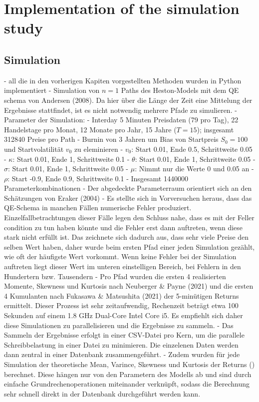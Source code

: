 \chapter{Implementation of the simulation study}
\label{sec:methodical_approach}

\section{Simulation}
- all die in den vorherigen Kapiten vorgestellten Methoden wurden in Python implementiert
- Simulation von $n=1$ Paths des Heston-Models mit dem QE schema von Andersen (2008). Da hier über die Länge der Zeit eine Mittelung der Ergebnisse stattfindet, ist es nicht notwendig mehrere Pfade zu simulieren.
- Parameter der Simulation:
    - Interday 5 Minuten Preisdaten (79 pro Tag), 22 Handelstage pro Monat, 12 Monate pro Jahr, 15 Jahre ($T = 15$); insgesamt 312840 Preise pro Path
    - Burnin von 3 Jahren um Bias von Startpreis $S_0 = 100$ und Startvolatilität $v_0$ zu eleminieren
    - $v_0$: Start 0.01, Ende 0.5, Schrittweite 0.05
    - $\kappa$: Start 0.01, Ende 1, Schrittweite 0.1
    - $\theta$: Start 0.01, Ende 1, Schrittweite 0.05
    - $\sigma$: Start 0.01, Ende 1, Schrittweite 0.05
    - $\mu$: Nimmt nur die Werte 0 und 0.05 an
    - $\rho$: Start -0.9, Ende 0.9, Schrittweite 0.1
    - Insgesamt 1440000 Parameterkombinationen
    - Der abgedeckte Parameterraum orientiert sich an den Schätzungen von Eraker (2004)
- Es stellte sich in Vorversuchen heraus, dass das QE-Schema in manchen Fällen numerische Fehler produziert. Einzelfallbetrachtungen dieser Fälle legen den Schluss nahe, dass es mit der Feller condition zu tun haben könnte und die Fehler erst dann auftreten, wenn diese stark nicht erfüllt ist. Das zeichnete sich dadurch aus, dass sehr viele Preise den selben Wert haben, daher wurde beim ersten Pfad einer jeden Simulation gezählt, wie oft der häufigste Wert vorkommt. Wenn keine Fehler bei der Simulation auftreten liegt dieser Wert im unteren einstelligen Bereich, bei Fehlern in den Hundertern bzw. Tausendern
- Pro Pfad wurden die ersten 4 realisierten Momente, Skewness und Kurtosis nach Neuberger & Payne (2021) und die ersten 4 Kumulanten nach Fukasawa & Matsushita (2021) der 5-minütigen Returns ermittelt. Dieser Prozess ist sehr zeitaufwendig, Rechenzeit beträgt etwa 100 Sekunden auf einem 1.8 GHz Dual-Core Intel Core i5. Es empfiehlt sich daher diese Simulationen zu parallelisieren und die Ergebnisse zu sammeln.
- Das Sammeln der Ergebnisse erfolgt in einer CSV-Datei pro Kern, um die parallele Schreibbelastung in einer Datei zu minimieren. Die einzelenen Daten werden dann zentral in einer Datenbank zusammengeführt.
- Zudem wurden für jede Simulation der theoretische Mean, Varince, Skewness und Kurtosis der Returns (\cite{okhrinDistributionalPropertiesContinuous2023}) berechnet. Diese hängen nur von den Parametern des Modells ab und sind durch einfache Grundrechenoperationen miteinander verknüpft, sodass die Berechnung sehr schnell direkt in der Datenbank durchgeführt werden kann.

